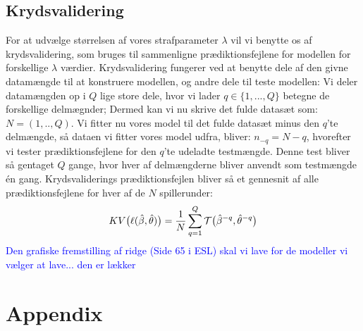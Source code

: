 \documentclass[11pt,a4paper]{article}
\begin{document}
\subsection{Krydsvalidering}
For at udvælge størrelsen af vores strafparameter $\lambda$ vil vi benytte os af krydsvalidering, som bruges til sammenligne prædiktionsfejlene for modellen for forskellige $\lambda$ værdier. Krydsvalidering fungerer ved at benytte dele af den givne datamængde til at konstruere modellen, og andre dele til teste modellen: Vi deler datamængden op i $Q$ lige store dele, hvor vi lader $q\in \{1,...,Q\}$ betegne de forskellige delmægnder; Dermed kan vi nu skrive det fulde datasæt som: $N=(1,..,Q)$. Vi fitter nu vores model til det fulde datasæt minus den $q$'te delmængde, så dataen vi fitter vores model udfra, bliver: $n_{-q}=N-q$, hvorefter vi tester prædiktionsfejlene for den $q$'te udeladte testmængde. Denne test bliver så gentaget $Q$ gange, hvor hver af delmængderne bliver anvendt som testmængde én gang. Krydsvaliderings prædiktionsfejlen bliver så et gennesnit af alle prædiktionsfejlene for hver af de $N$ spillerunder:
\begin{align*}
KV\big{(}\ell(\hat{\beta},\hat{\theta})\big{)}&=\frac{1}{N}\sum_{q=1}^Q\mathcal{T}\big{(}\hat{\beta}^{-q},\hat{\theta}^{-q}\big{)}\\
\end{align*}
\textcolor{blue}{Den grafiske fremstilling af ridge (Side 65 i ESL) skal vi lave for de modeller vi vælger at lave... den er lækker}
\clearpage
\section{Appendix}
\end{document}
